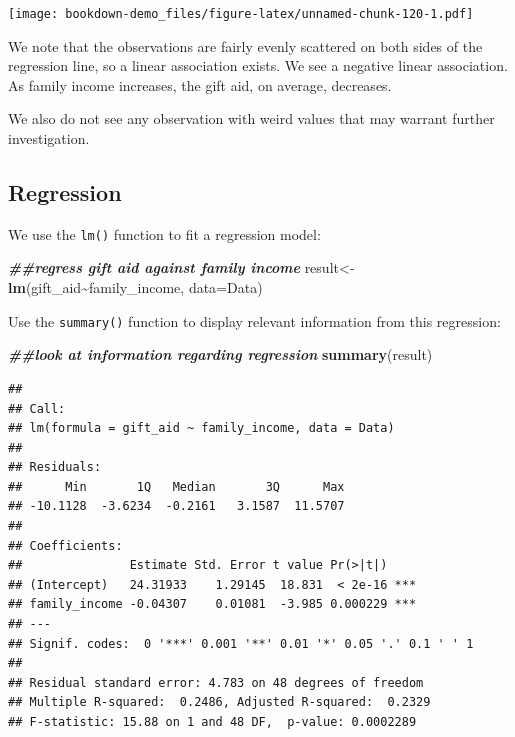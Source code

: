\documentclass[
]{book}
\newenvironment{Shaded}{\begin{snugshade}}{\end{snugshade}}
\newcommand{\AttributeTok}[1]{\textcolor[rgb]{0.13,0.29,0.53}{#1}}
\newcommand{\DocumentationTok}[1]{\textcolor[rgb]{0.56,0.35,0.01}{\textbf{\textit{#1}}}}
\newcommand{\FunctionTok}[1]{\textcolor[rgb]{0.13,0.29,0.53}{\textbf{#1}}}
\newcommand{\NormalTok}[1]{#1}
\newcommand{\OtherTok}[1]{\textcolor[rgb]{0.56,0.35,0.01}{#1}}
\newcommand{\SpecialCharTok}[1]{\textcolor[rgb]{0.81,0.36,0.00}{\textbf{#1}}}
\begin{document}
\texttt{[image: bookdown-demo\_files/figure-latex/unnamed-chunk-120-1.pdf]}

We note that the observations are fairly evenly scattered on both sides of the regression line, so a linear association exists. We see a negative linear association. As family income increases, the gift aid, on average, decreases.

We also do not see any observation with weird values that may warrant further investigation.

\hypertarget{regression}{%
\subsection*{Regression}\label{regression}}

We use the \texttt{lm()} function to fit a regression model:

\begin{Shaded}
\begin{Highlighting}[]
\DocumentationTok{\#\#regress gift aid against family income}
\NormalTok{result}\OtherTok{\textless{}{-}}\FunctionTok{lm}\NormalTok{(gift\_aid}\SpecialCharTok{\textasciitilde{}}\NormalTok{family\_income, }\AttributeTok{data=}\NormalTok{Data)}
\end{Highlighting}
\end{Shaded}

Use the \texttt{summary()} function to display relevant information from this regression:

\begin{Shaded}
\begin{Highlighting}[]
\DocumentationTok{\#\#look at information regarding regression}
\FunctionTok{summary}\NormalTok{(result)}
\end{Highlighting}
\end{Shaded}

\begin{verbatim}
## 
## Call:
## lm(formula = gift_aid ~ family_income, data = Data)
## 
## Residuals:
##      Min       1Q   Median       3Q      Max 
## -10.1128  -3.6234  -0.2161   3.1587  11.5707 
## 
## Coefficients:
##               Estimate Std. Error t value Pr(>|t|)    
## (Intercept)   24.31933    1.29145  18.831  < 2e-16 ***
## family_income -0.04307    0.01081  -3.985 0.000229 ***
## ---
## Signif. codes:  0 '***' 0.001 '**' 0.01 '*' 0.05 '.' 0.1 ' ' 1
## 
## Residual standard error: 4.783 on 48 degrees of freedom
## Multiple R-squared:  0.2486, Adjusted R-squared:  0.2329 
## F-statistic: 15.88 on 1 and 48 DF,  p-value: 0.0002289
\end{verbatim}
\end{document}

